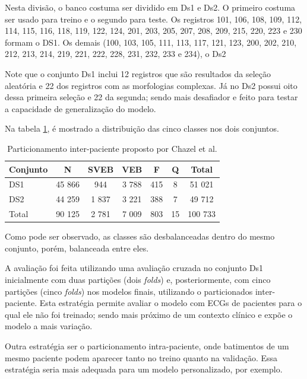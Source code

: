 Nesta divisão, o banco costuma ser dividido em Ds1 e Ds2. O primeiro costuma ser usado para treino e o segundo para teste.
Os registros 101, 106, 108, 109, 112, 114, 115, 116, 118, 119, 122, 124, 201, 203, 205, 207, 208, 209, 215, 220, 223 e 230 formam o DS1. Os demais (100, 103, 105, 111, 113, 117, 121, 123, 200, 202, 210, 212, 213, 214, 219, 221, 222, 228, 231, 232, 233 e 234), o Ds2

Note que o conjunto Ds1 inclui 12 registros que são resultados da seleção aleatória e 22 dos registros com as morfologias complexas. Já no Ds2 possui 
oito dessa primeira seleção e 22 da segunda; sendo mais desafiador e feito para testar a capacidade de generalização do modelo.

Na tabela \ref{tab:particionamento}, é mostrado a distribuição das cinco classes nos dois conjuntos.

\begin{table}[htb]
\centering
\caption{Particionamento inter-paciente proposto por Chazel et al.}
\label{tab:particionamento}
\begin{tabular}{|l|c|c|c|c|c|c|}
\hline
Conjunto & N & SVEB & VEB & F & Q & Total \\ \hline
DS1 & 45 866 & 944 & 3 788 & 415 & 8 & 51 021 \\ \hline
DS2 & 44 259 & 1 837 & 3 221 & 388 & 7 & 49 712 \\ \hline
Total & 90 125 & 2 781 & 7 009 & 803 & 15 & 100 733 \\ \hline
\end{tabular}
\end{table}

Como pode ser observado, as classes são desbalanceadas dentro do mesmo conjunto, porém, balanceada entre eles.

A avaliação foi feita utilizando uma avaliação cruzada no conjunto Ds1 inicialmente com duas partições (dois \textit{folds}) e, posteriormente, com cinco partições (cinco \textit{folds}) nos modelos finais, utilizando o particionados
inter-paciente. Esta estratégia permite avaliar o modelo com ECGs de pacientes para o qual ele não foi treinado; sendo mais próximo de um contexto clínico 
e expõe o modelo a mais variação.

Outra estratégia ser o particionamento intra-paciente, onde batimentos de um mesmo paciente podem aparecer tanto no treino quanto na validação. Essa estratégia seria 
mais adequada para um modelo personalizado, por exemplo. 

